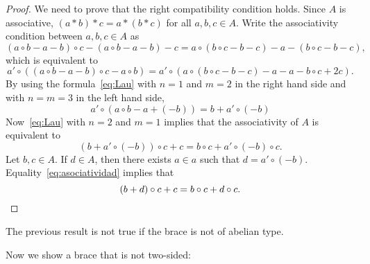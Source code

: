 \begin{proof}
    We need to prove that the right compatibility condition holds. 
    Since $A$ is associative, $(a*b)*c=a*(b*c)$ for all $a,b,c\in A$. Write the associativity condition between $a,b,c\in A$ as
 	\[
 	(a\circ b-a-b)\circ c-(a\circ b-a-b)-c
 	=a\circ (b\circ c-b-c)-a-(b\circ c-b-c),
 	\]
 	which is equivalent to 
 	\[
 	a'\circ ( (a\circ b-a-b)\circ c-a\circ b)
 	=a'\circ ( a\circ (b\circ c-b-c)-a-a-b\circ c+2c).
 	\]
    By using the formula~\eqref{eq:Lau} 
    with $n=1$ and $m=2$ in the right hand side and 
    with $n=m=3$ in the left hand side,  
 	\[
 	a'\circ (a\circ b-a+(-b))=b+a'\circ(-b)
 	\]
 	Now~\eqref{eq:Lau} with $n=2$ and $m=1$ implies that 
 	the associativity of $A$ is equivalent to 
 	\begin{equation}
 	    \label{eq:asociatividad}
 		(b+a'\circ (-b))\circ c+c=b\circ c+a'\circ(-b)\circ c.
 	\end{equation}
 	Let $b,c\in A$. If $d\in A$, then there exists $a\in a$ such that $d=a'\circ (-b)$. Equality~\eqref{eq:asociatividad} 
    implies that 
 	\[
 	(b+d)\circ c+c=b\circ c+d\circ c.\qedhere
 	\]
\end{proof}

The previous result is not true if the brace is not of abelian type. 

Now we show a brace that is not two-sided: 

\begin{example}

\end{example}

	
